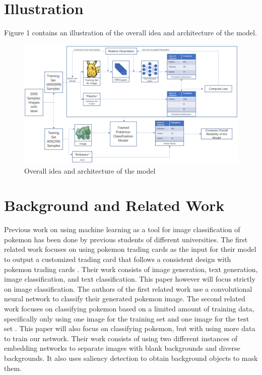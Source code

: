 \documentclass{article} %
\begin{document}
\section{Illustration}

Figure 1 contains an illustration of the overall idea and architecture of the model. 

\begin{figure}[h]
\begin{center}
\graphicspath{ {./imgs/} }
\includegraphics[width=\textwidth]{imgs/Modelillustration.png}
\end{center}
\caption{Overall idea and architecture of the model}
\end{figure}

\section{Background and Related Work}

Previous work on using machine learning as a tool for image classification of pokemon has been done by previous students of different universities. The first related work focuses on using pokemon trading cards as the input for their model to output a customized trading card that follows a consistent design with pokemon trading cards \citep{Card}. Their work consists of image generation, text generation, image classification, and text classification. 
This paper however will focus strictly on image classification. The authors of the first related work use a convolutional neural network to classify their generated pokemon image. The second related work focuses on classifying pokemon based on a limited amount of training data, specifically only using one image for the training set and one image for the test set \citep{Oneshot}. This paper will also focus on classifying pokemon, but with using more data to train our network. Their work consists of using two different instances of embedding networks to separate images with blank backgrounds and diverse backgrounds. It also uses saliency detection to obtain background objects to mask them.  
\end{document}
